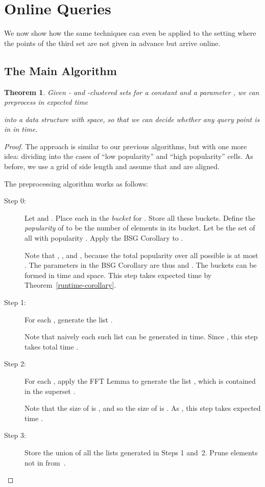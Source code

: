 \documentclass[11pt]{article}
\newcommand{\LONG}[1]{#1}\newcommand{\SHORT}[1]{}
\newtheorem{theorem}{Theorem}[section]
\begin{document}
\LONG{
\section{Online Queries}\label{sec:online}

We now show how the same techniques can even
be applied to the setting where the points of the third set  are not
given in advance but arrive online.

\subsection{The Main Algorithm}

\begin{theorem}\label{thm-cluster-online}
Given - and -clustered sets  for a constant  and a parameter ,
we can preprocess in expected time

into a data structure with  space,
so that we can decide whether any query point  is in 
in  time.
\end{theorem}
\begin{proof}
The approach is similar to our previous algorithms, but with
one more idea: dividing into the cases of ``low popularity''
and ``high popularity'' cells.
As before, we use a grid of side length  and assume
that  and  are aligned.

The preprocessing algorithm works as follows:
\begin{description}
\item[Step 0:] Let  and
.
Place each 
in the \emph{bucket} for .  Store all these
buckets.  Define the \emph{popularity}
of  to be the number of elements in its
bucket.  Let  be the set of all 
with popularity .
Apply the BSG Corollary to .

Note that , , and , because
the total popularity over all possible  is
at most .  The parameters in the BSG Corollary
are thus  and .
The buckets can be formed in  time and space.
This step takes  expected time
by Theorem~\ref{runtime-corollary}.
\item[Step 1:]
For each , generate the list
.

Note that naively each such list can
be generated in  time.
Since , this step takes total
time .

\item[Step 2:]
For each , apply the FFT Lemma to generate the list
,
which is contained in the
superset .

Note that the size of  is ,
and so the size of  is .
As , this step takes expected time
.
\item[Step 3:]
Store the union  of all the lists generated in Steps
1 and~2.
Prune elements not in  from~.


\end{description}
\end{proof}}
\end{document}

